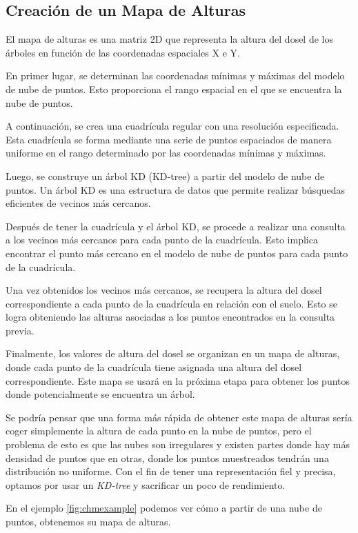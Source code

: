 \subsection{Creación de un Mapa de Alturas}
El mapa de alturas es una matriz 2D que representa la altura del dosel de los árboles en función de las coordenadas espaciales X e Y.

En primer lugar, se determinan las coordenadas mínimas y máximas del modelo de nube de puntos. Esto proporciona el rango espacial en el que se encuentra la nube de puntos.

A continuación, se crea una cuadrícula regular con una resolución especificada. Esta cuadrícula se forma mediante una serie de puntos espaciados de manera uniforme en el rango determinado por las coordenadas mínimas y máximas.

Luego, se construye un árbol KD (KD-tree) a partir del modelo de nube de puntos. Un árbol KD es una estructura de datos que permite realizar búsquedas eficientes de vecinos más cercanos.

Después de tener la cuadrícula y el árbol KD, se procede a realizar una consulta a los vecinos más cercanos para cada punto de la cuadrícula. Esto implica encontrar el punto más cercano en el modelo de nube de puntos para cada punto de la cuadrícula.

Una vez obtenidos los vecinos más cercanos, se recupera la altura del dosel correspondiente a cada punto de la cuadrícula en relación con el suelo. Esto se logra obteniendo las alturas asociadas a los puntos encontrados en la consulta previa.

Finalmente, los valores de altura del dosel se organizan en un mapa de alturas, donde cada punto de la cuadrícula tiene asignada una altura del dosel correspondiente. Este mapa se usará en la próxima etapa para obtener los puntos donde potencialmente se encuentra un árbol.

Se podría pensar que una forma más rápida de obtener este mapa de alturas sería coger simplemente la altura de cada punto en la nube de puntos, pero el problema de esto es que las nubes son irregulares y existen partes donde hay más densidad de puntos que en otras, donde los puntos muestreados tendrán una distribución no uniforme. Con el fin de tener una representación fiel y precisa, optamos por usar un \textit{KD-tree} y sacrificar un poco de rendimiento.

En el ejemplo \ref{fig:chmexample} podemos ver cómo a partir de una nube de puntos, obtenemos su mapa de alturas.


